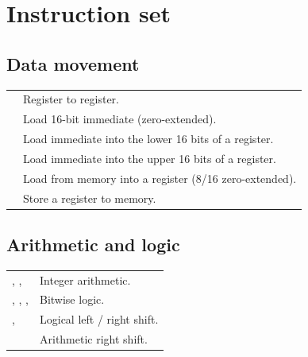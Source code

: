 \documentclass[11pt]{article}
\begin{document}
\section{Instruction set}

\subsection{Data movement}
\begin{center}
\begin{tabular}{@{}L{3.0cm} L{10.4cm}@{}}
\toprule
{}            & Register to register. \\
          & Load 16-bit immediate (zero-extended). \\
         & Load immediate into the lower 16 bits of a register. \\
         & Load immediate into the upper 16 bits of a register. \\
     & Load from memory into a register (8/16 zero-extended). \\
     & Store a register to memory. \\
\bottomrule
\end{tabular}
\end{center}

\subsection{Arithmetic and logic}
\begin{center}
\begin{tabular}{@{}L{3.0cm} L{10.4cm}@{}}
\toprule
{}, ,  & Integer arithmetic. \\
, , ,  & Bitwise logic. \\
,             & Logical left / right shift. \\
                        & Arithmetic right shift. \\
\bottomrule
\end{tabular}
\end{center}
\end{document}
